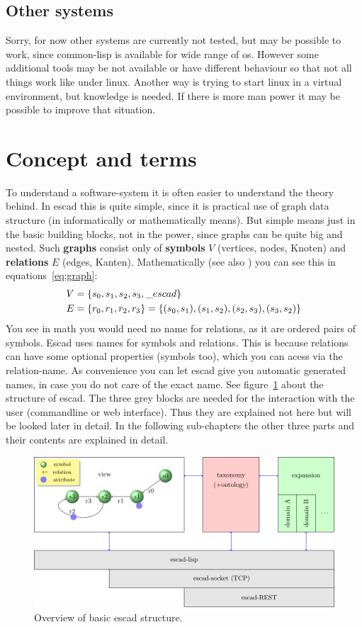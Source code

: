 \documentclass[a4paper, 12pt, openany]{scrbook}
\begin{document}
\subsection{Other systems}
Sorry, for now other systems are currently not tested, but may be possible to work, since common-lisp is available for wide range of os. However some additional tools may be not available or have different behaviour so that not all things work like under linux. Another way is trying to start linux in a virtual environment, but knowledge is needed. If there is more man power it may be possible to improve that situation.
\section{Concept and terms}\label{sec:concept}
To understand a software-system it is often easier to understand the theory behind. In escad this is quite simple, since it is practical use of graph data structure (in informatically or mathematically means). But simple means just in the basic building blocks, not in the power, since graphs can be quite big and nested. Such \textbf{graphs} consist only of \textbf{symbols} $V$ (vertices, nodes, Knoten) and \textbf{relations} $E$ (edges, Kanten). Mathematically (see also \cite{math:taschenbuchdermathematik}) you can see this in equations~\ref{eq:graph}:
\begin{align}
  \label{eq:graph}
  V & = \{s_0, s_1, s_2, s_3, \_escad\} \notag \\
  E & = \{r_0, r_1, r_2, r_3\} = \{(s_0, s_1), (s_1, s_2), (s_2, s_3), (s_3, s_2)\}
\end{align}
You see in math you would need no name for relations, as it are ordered pairs of symbols. Escad uses names for symbols and relations. This is because relations can have some optional properties (symbols too), which you can acess via the relation-name. As convenience you can let escad give you automatic generated names, in case you do not care of the exact name.
See figure~\ref{fig:overview} about the structure of escad. The three grey blocks are needed for the interaction with the user (commandline or web interface). Thus they are explained not here but will be looked later in detail. In the following sub-chapters the other three parts and their contents are explained in detail.
\begin{figure}[htbp]
  \centering
  \includegraphics{figures/overview.pdf}
  \caption{Overview of basic escad structure.}
  \label{fig:overview}
\end{figure}
\end{document}
